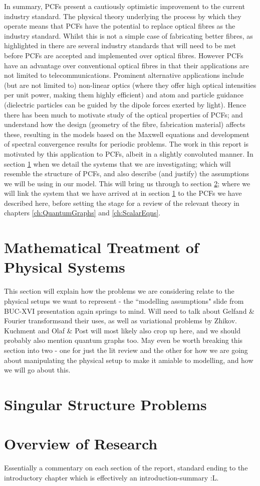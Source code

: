 In summary, PCFs present a cautiously optimistic improvement to the current industry standard.
The physical theory underlying the process by which they operate means that PCFs have the potential to replace optical fibres as the industry standard.
Whilst this is not a simple case of fabricating better fibres, as highlighted in \cite{knight2003photonic} there are several industry standards that will need to be met before PCFs are accepted and implemented over optical fibres.
However PCFs have an advantage over conventional optical fibres in that their applications are not limited to telecommunications.
Prominent alternative applications include (but are not limited to) non-linear optics (where they offer high optical intensities per unit power, making them highly efficient) and atom and particle guidance (dielectric particles can be guided by the dipole forces exerted by light).
Hence there has been much to motivate study of the optical properties of PCFs; and understand how the design (geometry of the fibre, fabrication material) affects these, resulting in the models based on the Maxwell equations and development of spectral convergence results for periodic problems.
The work in this report is motivated by this application to PCFs, albeit in a slightly convoluted manner.
In section \ref{sec:MathTreatmentPhysSystems} when we detail the systems that we are investigating; which will resemble the structure of PCFs, and also describe (and justify) the assumptions we will be using in our model.
This will bring us through to section \ref{sec:GraphLitReview}; where we will link the system that we have arrived at in section \ref{sec:MathTreatmentPhysSystems} to the PCFs we have described here, before setting the stage for a review of the relevant theory in chapters \ref{ch:QuantumGraphs} and \ref{ch:ScalarEqns}.

\section{Mathematical Treatment of Physical Systems} \label{sec:MathTreatmentPhysSystems}
This section will explain how the problems we are considering relate to the physical setups we want to represent - the ``modelling assumptions" slide from BUC-XVI presentation again springs to mind.
Will need to talk about Gelfand \& Fourier transformsand their uses, as well as variational problems by Zhikov.
Kuchment and Olaf \& Post will most likely also crop up here, and we should probably also mention quantum graphs too.
May even be worth breaking this section into two - one for just the lit review and the other for how we are going about manipulating the physical setup to make it amiable to modelling, and how we will go about this.

\section{Singular Structure Problems} \label{sec:GraphLitReview}

\section{Overview of Research} \label{sec:ReportOverview}
Essentially a commentary on each section of the report, standard ending to the introductory chapter which is effectively an introduction-summary :L.